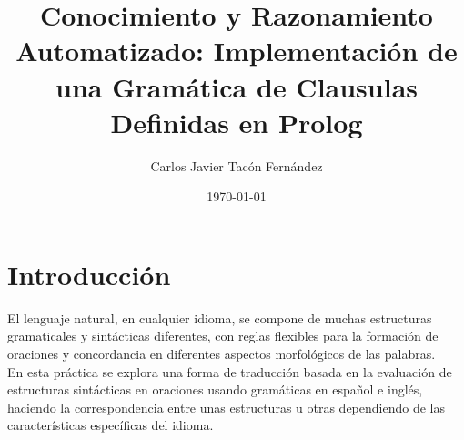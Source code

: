 \documentclass{article}
\title{Conocimiento y Razonamiento Automatizado: Implementación de una Gramática de Clausulas Definidas en Prolog}
\author{Carlos Javier Tacón Fernández}
\date{\today}
\begin{document}
\maketitle

\section{Introducción }
El lenguaje natural, en cualquier idioma, se compone de muchas estructuras gramaticales y sintácticas diferentes, 
con reglas flexibles para la formación de oraciones y concordancia en diferentes aspectos morfológicos de las palabras. \\

En esta práctica se explora una forma de traducción basada en la evaluación de estructuras sintácticas 
en oraciones usando gramáticas en español e inglés, haciendo la correspondencia entre unas estructuras 
u otras dependiendo de las características específicas del idioma.
\end{document}
